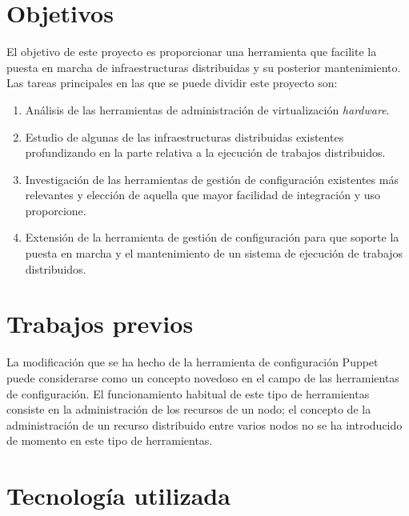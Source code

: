 \section{Objetivos}

El objetivo de este proyecto es proporcionar una herramienta que facilite la puesta en marcha de infraestructuras distribuidas y su posterior mantenimiento. Las tareas principales en las que se puede dividir este proyecto son:

\begin{enumerate}
\item Análisis de las herramientas de administración de virtualización \emph{hardware}.
\item Estudio de algunas de las infraestructuras distribuidas existentes profundizando en la parte relativa a la ejecución de trabajos distribuidos.
\item Investigación de las herramientas de gestión de configuración existentes más relevantes y elección de aquella que mayor facilidad de integración y uso proporcione.
\item Extensión de la herramienta de gestión de configuración para que soporte la puesta en marcha y el mantenimiento de un sistema de ejecución de trabajos distribuidos.
\end{enumerate}


\section{Trabajos previos}

La modificación que se ha hecho de la herramienta de configuración Puppet puede considerarse como un concepto novedoso en el campo de las herramientas de configuración. El funcionamiento habitual de este tipo de herramientas consiste en la administración de los recursos de un nodo; el concepto de la administración de un recurso distribuido entre varios nodos no se ha introducido de momento en este tipo de herramientas.


\section{Tecnología utilizada}

